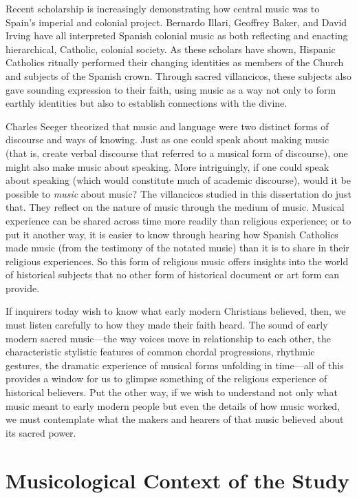 Recent scholarship is increasingly demonstrating how central music was to Spain's imperial and colonial project.
Bernardo Illari, Geoffrey Baker, and David Irving have all interpreted Spanish colonial music as both reflecting and enacting hierarchical, Catholic, colonial society.%
	\autocites{Illari:Polychoral}{Baker:Harmony}{Irving:Colonial}
As these scholars have shown, Hispanic Catholics ritually performed their changing identities as members of the Church and subjects of the Spanish crown. 
Through sacred villancicos, these subjects also gave sounding expression to their faith, using music as a way not only to form earthly identities but also to establish connections with the divine.

Charles Seeger theorized that music and language were two distinct forms of discourse and ways of knowing.%
	\autocite{Seeger:Unitary}
Just as one could speak about making music (that is, create verbal discourse that referred to a musical form of discourse), one might also make music about speaking.
More intriguingly, if one could speak about speaking (which would constitute much of academic discourse), would it be possible to \emph{music} about music? 
The villancicos studied in this dissertation do just that. 
They reflect on the nature of music through the medium of music.
Musical experience can be shared across time more readily than religious experience; or to put it another way, it is easier to know through hearing how Spanish Catholics made music (from the testimony of the notated music) than it is to share in their religious experiences.
So this form of religious music offers insights into the world of historical subjects that no other form of historical document or art form can provide.

If inquirers today wish to know what early modern Christians believed, then, we must listen carefully to how they made their faith heard.
The sound of early modern sacred music---the way voices move in relationship to each other, the characteristic stylistic features of common chordal progressions, rhythmic gestures, the dramatic experience of musical forms unfolding in time---all of this provides a window for us to glimpse something of the religious experience of historical believers.
Put the other way, if we wish to understand not only what music meant to early modern people but even the details of how music worked, we must contemplate what the makers and hearers of that music believed about its sacred power. 

\section{%
Musicological Context of the Study
}

